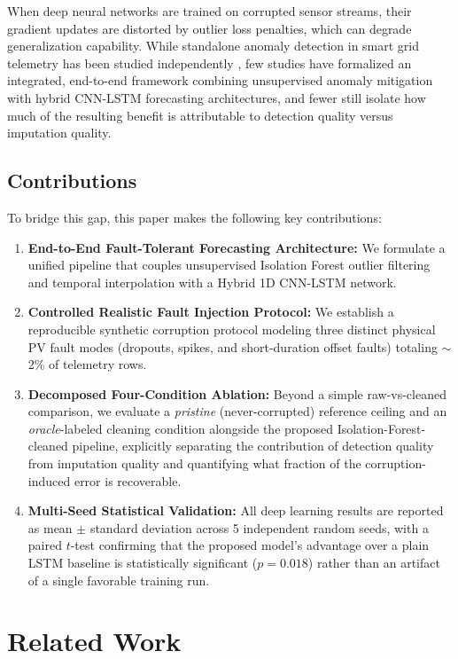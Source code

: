 \documentclass[conference]{IEEEtran}
\begin{document}
When deep neural networks are trained on corrupted sensor streams, their gradient updates are distorted by outlier loss penalties, which can degrade generalization capability. While standalone anomaly detection in smart grid telemetry has been studied independently \cite{zhang2021survey}, few studies have formalized an integrated, end-to-end framework combining unsupervised anomaly mitigation with hybrid CNN-LSTM forecasting architectures, and fewer still isolate how much of the resulting benefit is attributable to detection quality versus imputation quality.

\subsection*{Contributions}
To bridge this gap, this paper makes the following key contributions:
\begin{enumerate}
    \item \textbf{End-to-End Fault-Tolerant Forecasting Architecture:} We formulate a unified pipeline that couples unsupervised Isolation Forest outlier filtering and temporal interpolation with a Hybrid 1D CNN-LSTM network.
    \item \textbf{Controlled Realistic Fault Injection Protocol:} We establish a reproducible synthetic corruption protocol modeling three distinct physical PV fault modes (dropouts, spikes, and short-duration offset faults) totaling $\sim$2\% of telemetry rows.
    \item \textbf{Decomposed Four-Condition Ablation:} Beyond a simple raw-vs-cleaned comparison, we evaluate a \emph{pristine} (never-corrupted) reference ceiling and an \emph{oracle}-labeled cleaning condition alongside the proposed Isolation-Forest-cleaned pipeline, explicitly separating the contribution of detection quality from imputation quality and quantifying what fraction of the corruption-induced error is recoverable.
    \item \textbf{Multi-Seed Statistical Validation:} All deep learning results are reported as mean $\pm$ standard deviation across 5 independent random seeds, with a paired $t$-test confirming that the proposed model's advantage over a plain LSTM baseline is statistically significant ($p=0.018$) rather than an artifact of a single favorable training run.
\end{enumerate}

\section{Related Work}
\end{document}
